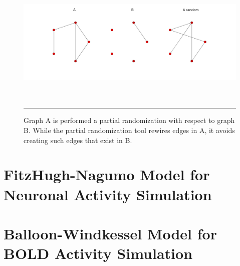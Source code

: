 \begin{figure}[htbp]
  \centering
	\includegraphics[width=\textwidth, height=60mm]{Figures/p1.png}  
    \rule{35em}{0.5pt}
    \caption[Partial Randomization Example]{Graph A is performed a partial randomization with respect to graph B. While the partial randomization tool rewires edges in A, it avoids creating such edges that exist in B.}
  \label{fig:Partial Randomization Example}
\end{figure}


\section{FitzHugh-Nagumo Model for Neuronal Activity Simulation}

\section{Balloon-Windkessel Model for BOLD Activity Simulation} 
 
